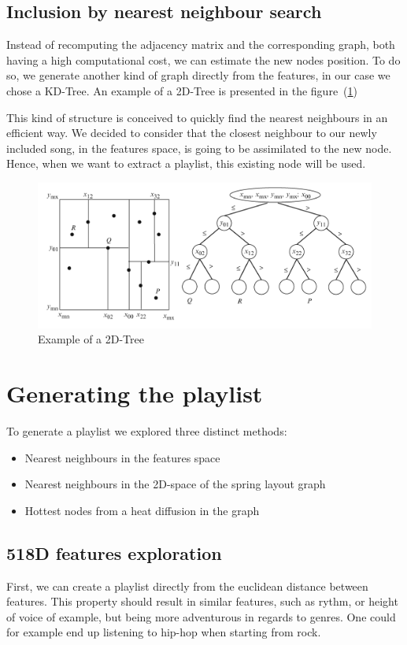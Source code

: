 \documentclass[11pt,a4paper,twoside]{article}
\begin{document}
\subsection{Inclusion by nearest neighbour search}
Instead of recomputing the adjacency matrix and the corresponding graph, both having a high computational cost, we can estimate the new nodes position. To do so, we generate another kind of graph directly from the features, in our case we chose a KD-Tree.
An example of a 2D-Tree is presented in the figure~(\ref{fig:ex_tree})

This kind of structure is conceived to quickly find the nearest neighbours in an efficient way.
We decided to consider that the closest neighbour to our newly included song, in the features space, is going to be assimilated to the new node. Hence, when we want to extract a playlist, this existing node will be used. %

\begin{figure}[H]
  \centering
    \includegraphics[width=\textwidth]{./Figures/tree}
  \caption{Example of a 2D-Tree}
  \label{fig:ex_tree}
\end{figure}

\newpage
\section{Generating the playlist}

To generate a playlist we explored three distinct methods:
\begin{itemize}
\item Nearest neighbours in the features space
\item Nearest neighbours in the 2D-space of the spring layout graph 
\item Hottest nodes from a heat diffusion in the graph
\end{itemize}

\subsection{518D features exploration}
First, we can create a playlist directly from the euclidean distance between features. This property should result in similar features, such as rythm, or height of voice of example, but being more adventurous in regards to genres. One could for example end up listening to hip-hop when starting from rock.
\end{document}
